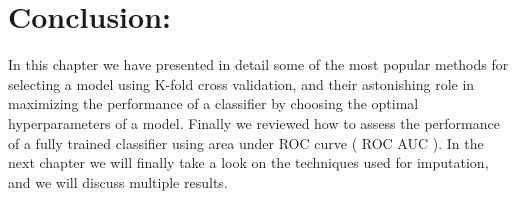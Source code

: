 \section{Conclusion:}

In this chapter we have presented in detail some of the most popular  methods for selecting  a model using K-fold cross validation, and their astonishing role in maximizing the performance of a classifier by choosing the optimal hyperparameters of a model.
Finally we reviewed  how to  assess the performance of a fully trained classifier using area under ROC curve ( ROC AUC ).
In the next chapter we will finally take a look on the techniques used for imputation, and we will discuss multiple results.
